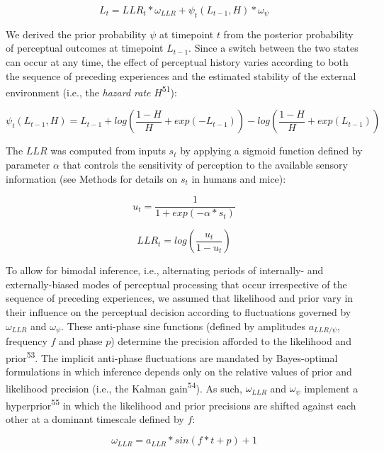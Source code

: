 \documentclass[
]{article}
\begin{document}
\begin{equation}
L_t = LLR_t * \omega_{LLR} + \psi_t(L_{t-1}, H) * \omega_{\psi}
\end{equation}

We derived the prior probability \(\psi\) at timepoint \(t\) from the
posterior probability of perceptual outcomes at timepoint \(L_{t-1}\).
Since a switch between the two states can occur at any time, the effect
of perceptual history varies according to both the sequence of preceding
experiences and the estimated stability of the external environment
(i.e., the \emph{hazard rate} \(H\)\textsuperscript{51}):

\begin{equation}
\psi_t(L_{t-1}, H)  = L_{t-1} + log(\frac{1-H}{H} + exp(-L_{t-1})) - log(\frac{1-H}{H} + exp(L_{t-1}))
\end{equation}

The \(LLR\) was computed from inputs \(s_t\) by applying a sigmoid
function defined by parameter \(\alpha\) that controls the sensitivity
of perception to the available sensory information (see Methods for
details on \(s_t\) in humans and mice):

\begin{equation}
u_t = \frac{1}{1 + exp(-\alpha * s_t)}
\end{equation}

\begin{equation}
LLR_t = log(\frac{u_t}{1-u_t})
\end{equation}

To allow for bimodal inference, i.e., alternating periods of internally-
and externally-biased modes of perceptual processing that occur
irrespective of the sequence of preceding experiences, we assumed that
likelihood and prior vary in their influence on the perceptual decision
according to fluctuations governed by \(\omega_{LLR}\) and
\(\omega_{\psi}\). These anti-phase sine functions (defined by
amplitudes \(a_{LLR/\psi}\), frequency \(f\) and phase \(p\)) determine
the precision afforded to the likelihood and prior\textsuperscript{53}.
The implicit anti-phase fluctuations are mandated by Bayes-optimal
formulations in which inference depends only on the relative values of
prior and likelihood precision (i.e., the Kalman
gain\textsuperscript{54}). As such, \(\omega_{LLR}\) and
\(\omega_{\psi}\) implement a hyperprior\textsuperscript{55} in which
the likelihood and prior precisions are shifted against each other at a
dominant timescale defined by \(f\):

\begin{equation}
\omega_{LLR} = a_{LLR} * sin(f * t + p) + 1
\end{equation}
\end{document}
